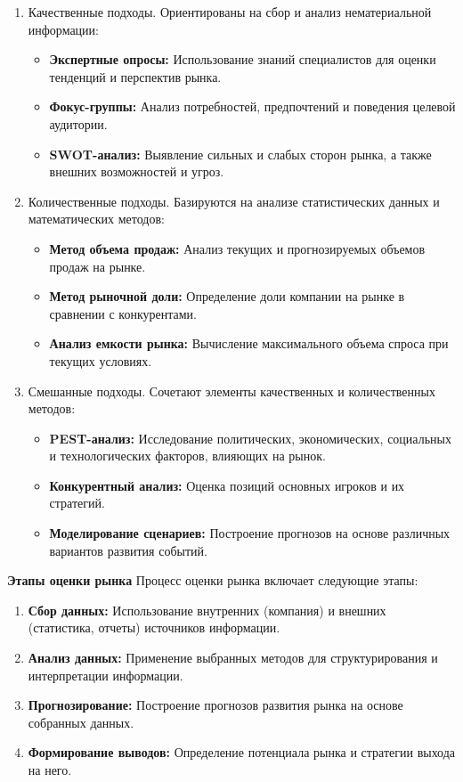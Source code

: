 \begin{enumerate}
    \item Качественные подходы. Ориентированы на сбор и анализ нематериальной информации:
    \begin{itemize}
        \item \textbf{Экспертные опросы:} Использование знаний специалистов для оценки тенденций и перспектив рынка.
        \item \textbf{Фокус-группы:} Анализ потребностей, предпочтений и поведения целевой аудитории.
        \item \textbf{SWOT-анализ:} Выявление сильных и слабых сторон рынка, а также внешних возможностей и угроз.
    \end{itemize}
    \item Количественные подходы. Базируются на анализе статистических данных и математических методов:
    \begin{itemize}
        \item \textbf{Метод объема продаж:} Анализ текущих и прогнозируемых объемов продаж на рынке.
        \item \textbf{Метод рыночной доли:} Определение доли компании на рынке в сравнении с конкурентами.
        \item \textbf{Анализ емкости рынка:} Вычисление максимального объема спроса при текущих условиях.
    \end{itemize}

    \item Смешанные подходы. Сочетают элементы качественных и количественных методов:
    \begin{itemize}
        \item \textbf{PEST-анализ:} Исследование политических, экономических, социальных и технологических факторов, влияющих на рынок.
        \item \textbf{Конкурентный анализ:} Оценка позиций основных игроков и их стратегий.
        \item \textbf{Моделирование сценариев:} Построение прогнозов на основе различных вариантов развития событий.
    \end{itemize}
\end{enumerate}

\textbf{Этапы оценки рынка}
Процесс оценки рынка включает следующие этапы:
\begin{enumerate}
    \item \textbf{Сбор данных:} Использование внутренних (компания) и внешних (статистика, отчеты) источников информации.
    \item \textbf{Анализ данных:} Применение выбранных методов для структурирования и интерпретации информации.
    \item \textbf{Прогнозирование:} Построение прогнозов развития рынка на основе собранных данных.
    \item \textbf{Формирование выводов:} Определение потенциала рынка и стратегии выхода на него.
\end{enumerate}


